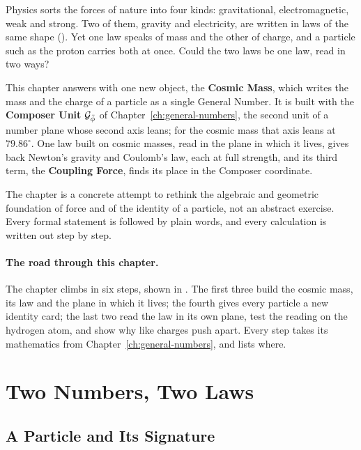 \bigskip

Physics sorts the forces of nature into four kinds: gravitational, electromagnetic, weak and strong. Two of them, gravity and electricity, are written in laws of the same shape (). Yet one law speaks of mass and the other of charge, and a particle such as the proton carries both at once. Could the two laws be one law, read in two ways?

This chapter answers with one new object, the \textbf{Cosmic Mass}, which writes the mass and the charge of a particle as a single General Number. It is built with the \textbf{Composer Unit} $\mathcal{G}_{\bar{\phi}}$ of Chapter~\ref{ch:general-numbers}, the second unit of a number plane whose second axis leans; for the cosmic mass that axis leans at $79.86^\circ$. One law built on cosmic masses, read in the plane in which it lives, gives back Newton's gravity and Coulomb's law, each at full strength, and its third term, the \textbf{Coupling Force}, finds its place in the Composer coordinate.

The chapter is a concrete attempt to rethink the algebraic and geometric foundation of force and of the identity of a particle, not an abstract exercise. Every formal statement is followed by plain words, and every calculation is written out step by step.

\paragraph{The road through this chapter.}
The chapter climbs in six steps, shown in . The first three build the cosmic mass, its law and the plane in which it lives; the fourth gives every particle a new identity card; the last two read the law in its own plane, test the reading on the hydrogen atom, and show why like charges push apart. Every step takes its mathematics from Chapter~\ref{ch:general-numbers}, and  lists where.

\section{Two Numbers, Two Laws}\label{sec:formal-definitions}

\subsection{A Particle and Its Signature}\label{subsec:dual-scalar}

